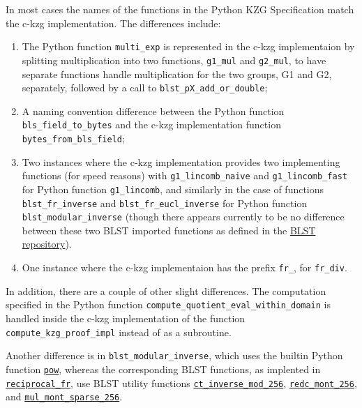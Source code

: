 \documentclass[12pt]{galois-whitepaper}
\begin{document}
In most cases the names of the functions in the Python KZG Specification match the c-kzg implementation.
The differences include:
\begin{enumerate}
    \item The Python function \texttt{multi\_exp} is represented in the c-kzg implementaion
by splitting multiplication into two functions, \texttt{g1\_mul} and \texttt{g2\_mul}, to have separate functions
handle multiplication for the two groups, G1 and G2, separately, followed by a call to \texttt{blst\_pX\_add\_or\_double};
    \item A naming convention difference between the Python function \texttt{bls\_field\_to\_bytes} and the c-kzg
implementation function \texttt{bytes\_from\_bls\_field};
    \item Two instances where the c-kzg implementation provides two implementing functions (for speed reasons) with
\texttt{g1\_lincomb\_naive} and \texttt{g1\_lincomb\_fast} for Python function \texttt{g1\_lincomb}, and
similarly in the case of functions \texttt{blst\_fr\_inverse} and \texttt{blst\_fr\_eucl\_inverse} for Python function
\texttt{blst\_modular\_inverse} (though there appears currently to be no difference between these two BLST imported
functions as defined in the
\href{https://github.com/supranational/blst/blob/415d4f0e2347a794091836a3065206edfd9c72f3/src/recip.c#L135}{BLST repository}).
    \item One instance where the c-kzg implementaion has the prefix \texttt{fr\_}, for \texttt{fr\_div}.
\end{enumerate}

In addition, there are a couple of other slight differences. The computation specified in the Python function
\texttt{compute\_quotient\_eval\_within\_domain} is handled inside the c-kzg implementation of the
function \texttt{compute\_kzg\_proof\_impl} instead of as a subroutine.

Another difference is in \texttt{blst\_modular\_inverse}, which uses the builtin Python function
\href{https://docs.python.org/3/library/functions.html#pow}{\texttt{pow}}, whereas the corresponding BLST functions, as implented in
\href{https://github.com/supranational/blst/blob/415d4f0e2347a794091836a3065206edfd9c72f3/src/recip.c#L122}{\texttt{reciprocal\_fr}},
use BLST utility functions \href{https://github.com/supranational/blst/blob/master/src/vect.h#L142}{\texttt{ct\_inverse\_mod\_256}},
\href{https://github.com/supranational/blst/blob/415d4f0e2347a794091836a3065206edfd9c72f3/src/recip.c#L131}{\texttt{redc\_mont\_256}}, and
\href{https://github.com/supranational/blst/blob/415d4f0e2347a794091836a3065206edfd9c72f3/src/recip.c#L132}{\texttt{mul\_mont\_sparse\_256}}.
\end{document}

